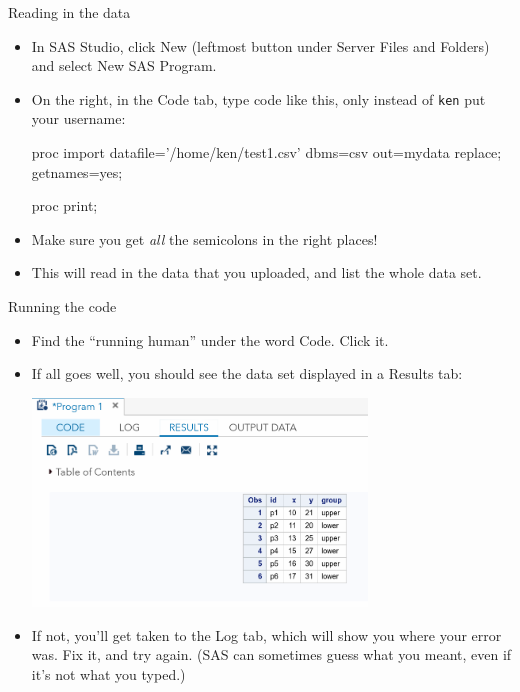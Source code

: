 \documentclass[unknownkeysallowed]{beamer}\usepackage[]{graphicx}\usepackage[]{color}
\begin{document}
\begin{frame}[fragile]{Reading in the data}
  
  \begin{itemize}
  \item In SAS Studio, click New (leftmost button under Server Files
    and Folders) and select New SAS Program.
  \item On the right, in the Code tab, type code like this, only
    instead of \texttt{ken} put your username:
    
    \begin{Datastep}
proc import 
  datafile='/home/ken/test1.csv'
  dbms=csv
  out=mydata
  replace;
  getnames=yes;
    \end{Datastep}
    
    \begin{Sascode}[store=ra]
proc print;
    \end{Sascode}
  \item Make sure you get \emph{all} the semicolons in the right
    places!
  \item This will read in the data that you uploaded, and list the
    whole data set.
  \end{itemize}
  
\end{frame}


\begin{frame}[fragile]{Running the code}
  
  \begin{itemize}
  \item Find the ``running human'' under the word Code. Click it. 
  \item If all goes well, you should see the data set displayed in a
    Results tab:
    
\includegraphics[width=0.7\textwidth]{sasstudio-results}

\item If not, you'll get taken to the Log tab, which will show you
  where your error was. Fix it, and try again. (SAS can sometimes
  guess what you meant, even if it's not what you typed.)
  \end{itemize}
  
\end{frame}
\end{document}
